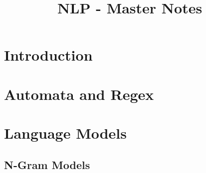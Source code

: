 \documentclass[]{article}
\title{NLP - Master Notes}
\begin{document}
	\maketitle
	
	\section{Introduction}
	
	\section{Automata and Regex}
	
	\section{Language Models}
	
	\subsection{N-Gram Models}
	
\end{document}
